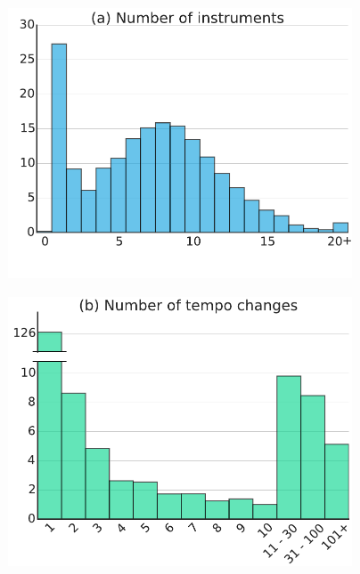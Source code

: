\documentclass{article}
\begin{document}
\begin{figure}
    \centering
    \begin{subfigure}{.23\textwidth}
        \includegraphics[width=\textwidth]{n_instruments.pdf}
    \end{subfigure}
    \begin{subfigure}{.23\textwidth}
        \includegraphics[width=\textwidth]{n_tempos.pdf}
    \end{subfigure}
    \begin{subfigure}{.23\textwidth}

\end{subfigure}
\end{figure}
\end{document}
